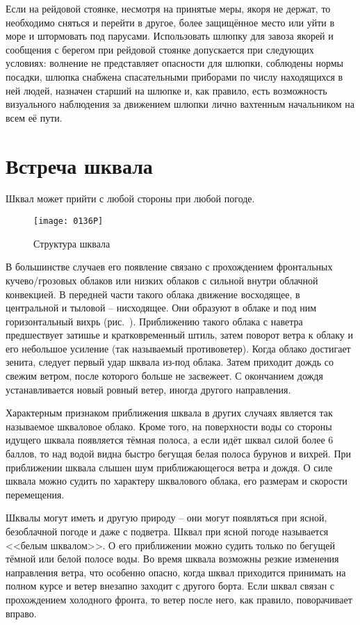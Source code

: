 Если на рейдовой стоянке, несмотря на принятые меры, якоря не держат,
то необходимо сняться и перейти в другое, более защищённое место или
уйти в море и штормовать под парусами. Использовать шлюпку для завоза
якорей и сообщения с берегом при рейдовой стоянке допускается при
следующих условиях: волнение не представляет опасности для шлюпки,
соблюдены нормы посадки, шлюпка снабжена спасательными приборами по
числу находящихся в ней людей, назначен старший на шлюпке и, как
правило, есть возможность визуального наблюдения за движением шлюпки
лично вахтенным начальником на всем её пути.

\section{Встреча шквала}

Шквал может прийти с любой стороны при любой погоде.

\begin{figure*}[h]
  \centering{}
  \texttt{[image: 0136P]}
  \caption{Структура шквала}
  \label{fig:136}
\end{figure*}

В большинстве случаев его появление связано с прохождением фронтальных
кучево\-/грозовых облаков или низких облаков с сильной внутри облачной
конвекцией. В передней части такого облака движение восходящее, в
центральной и тыловой \--- нисходящее. Они образуют в облаке и под ним
горизонтальный вихрь (рис.~). Приближению такого облака с
наветра предшествует затишье и кратковременный штиль, затем поворот
ветра к облаку и его небольшое усиление (так называемый
противоветер). Когда облако достигает зенита, следует первый удар
шквала из-под облака. Затем приходит дождь со свежим ветром, после
которого больше не засвежеет. С окончанием дождя устанавливается новый
ровный ветер, иногда другого направления.

Характерным признаком приближения шквала в других случаях является так
называемое шкваловое облако. Кроме того, на поверхности воды со
стороны идущего шквала появляется тёмная полоса, а если идёт шквал
силой более 6 баллов, то над водой видна быстро бегущая белая
полоса бурунов и вихрей. При приближении шквала слышен шум
приближающегося ветра и дождя. О силе шквала можно судить по характеру
шквалового облака, его размерам и скорости перемещения.

Шквалы могут иметь и другую природу \--- они могут появляться при
ясной, безоблачной погоде и даже с подветра. Шквал при ясной погоде
называется <<белым
шквалом>>. О его
приближении можно судить только по бегущей тёмной или белой полосе
воды. Во время шквала возможны резкие изменения направления ветра, что
особенно опасно, когда шквал приходится принимать на полном курсе и
ветер внезапно заходит с другого борта. Если шквал связан с
прохождением холодного фронта, то ветер после него, как правило,
поворачивает вправо.


